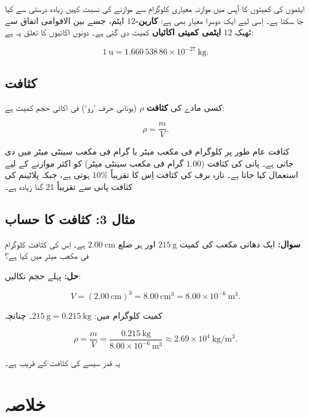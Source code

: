 \documentclass{urdu-textbook}
\begin{document}
ایٹموں کی کمیتوں کا آپس میں موازنہ معیاری کلوگرام سے موازنے کی نسبت کہیں
زیادہ درستی سے کیا جا سکتا ہے۔ اِسی لیے ایک دوسرا معیار بھی ہے:
\textbf{کاربن-\(12\)} ایٹم، جسے بین الاقوامی اتفاق سے ٹھیک \(12\)
\textbf{ایٹمی کمیتی اکائیاں}  کمیت دی گئی ہے۔ دونوں اکائیوں کا تعلق
یہ ہے:

\[1\ \mathrm{u} = 1.660\,538\,86\times10^{-27}\ \mathrm{kg}.\]

\hypertarget{ux6a9ux62bux627ux641ux62a}{%
\subsection{کثافت}\label{ux6a9ux62bux627ux641ux62a}}

کسی مادے کی \textbf{کثافت} \(\rho\) (یونانی حرف 'رو`) فی اکائی حجم کمیت
ہے:

\[\rho = \frac{m}{V}.\]

کثافت عام طور پر کلوگرام فی مکعب میٹر یا گرام فی مکعب سینٹی میٹر میں دی
جاتی ہے۔ پانی کی کثافت (\(1.00\) گرام فی مکعب سینٹی میٹر) کو اکثر موازنے
کے لیے استعمال کیا جاتا ہے۔ تازہ برف کی کثافت اِس کا تقریباً \(10\%\) ہوتی
ہے، جبکہ پلاٹینم کی کثافت پانی سے تقریباً \(21\) گنا زیادہ ہے۔

\hypertarget{ux645ux62bux627ux644-3-ux6a9ux62bux627ux641ux62a-ux6a9ux627-ux62dux633ux627ux628}{%
\subsection{مثال 3: کثافت کا
حساب}\label{ux645ux62bux627ux644-3-ux6a9ux62bux627ux641ux62a-ux6a9ux627-ux62dux633ux627ux628}}

\textbf{سوال:} ایک دھاتی مکعب کی کمیت \(215\ \mathrm{g}\) اور ہر ضلع
\(2.00\ \mathrm{cm}\) ہے۔ اِس کی کثافت کلوگرام فی مکعب میٹر میں کیا ہے؟

\textbf{حل:} پہلے حجم نکالیں:

\[V = (2.00\ \mathrm{cm})^{3} = 8.00\ \mathrm{cm^{3}} = 8.00\times10^{-6}\ \mathrm{m^{3}}.\]

کمیت کلوگرام میں: \(215\ \mathrm{g} = 0.215\ \mathrm{kg}\)۔ چنانچہ

\[\rho = \frac{m}{V} = \frac{0.215\ \mathrm{kg}}{8.00\times10^{-6}\ \mathrm{m^{3}}} \approx 2.69\times10^{4}\ \mathrm{kg/m^{3}}.\]

یہ قدر سیسے  کی کثافت کے قریب ہے۔

\hypertarget{ux62eux644ux627ux635ux6c1}{%
\section*{خلاصہ}\label{ux62eux644ux627ux635ux6c1}}
\end{document}
